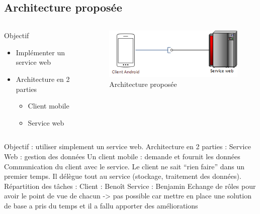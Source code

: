 \documentclass{beamer} %
\begin{document}
  \subsection{Architecture proposée}
  \begin{frame}{\subsecname}

    \begin{columns}
      \begin{column}{0.5\textwidth}
        \begin{exampleblock}{Objectif}
          \begin{itemize}
            \item Implémenter un service web
            \item Architecture en 2 parties
            \begin{itemize}
              \item Client mobile
              \item Service web
            \end{itemize}
          \end{itemize}
        \end{exampleblock}
      \end{column}
      \begin{column}{0.5\textwidth}
        \begin{figure}
        \includegraphics[width=\linewidth, height=\textheight, keepaspectratio]{archi_finale.png}
        \caption{Architecture proposée}
        \end{figure}
      \end{column}
    \end{columns}

    Objectif : utiliser simplement un service web.
    Architecture en 2 parties :
    Service Web : gestion des données
    Un client mobile : demande et fournit les données
    Communication du client avec le service. Le client ne sait “rien faire” dans un premier temps. Il délègue tout au service (stockage, traitement des données).
    Répartition des tâches :
    Client : Benoît
    Service : Benjamin
    Echange de rôles pour avoir le point de vue de chacun -> pas possible car mettre en place une solution de base a pris du temps et il a fallu apporter des améliorations
  \end{frame}
\end{document}
